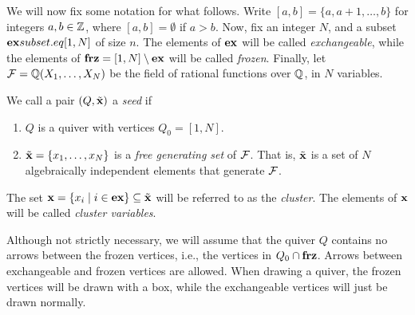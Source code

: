 We will now fix some notation for what follows. Write $[a,b] = \{a, a + 1, \dots, b\}$
for integers $a,b \in \mathbb{Z}$, where $[a,b] = \emptyset$ if $a > b$. Now, fix an integer
$N$, and a subset $\mathbf{ex} subset.eq [1, N]$ of size $n$. The elements of $\mathbf{ex}$ will be
called \emph{exchangeable}, while the elements of $\mathbf{frz} = [1, N]
	\setminus \mathbf{ex}$ will be called \emph{frozen}. Finally, let $\mathcal{F} = \mathbb{Q}
	(X_1, \dots, X_N)$ be the field of rational functions over $\mathbb{Q}$, in $N$ variables.

\begin{definition}
	We call a pair $(Q, \tilde{\mathbf{x}})$ a \emph{seed} if
	\begin{enumerate}
		\item $Q$ is a quiver with vertices $Q_0 = [1, N]$.
		\item $\tilde{\mathbf{x}} = \{x_1, \dots, x_N\}$ is a \emph{free generating set} of $\mathcal{F}$. That is, $\tilde{\mathbf{x}}$ is a set of $N$ algebraically independent elements that generate $\mathcal{F}$.
	\end{enumerate}
	The set $\mathbf{x} = \{x_i \mid i \in \mathbf{ex}\} \subseteq \tilde{\mathbf{x}}$ will be referred to as the \emph{cluster}. The elements of $\mathbf{x}$ will be called \emph{cluster variables}.
\end{definition}

Although not strictly necessary, we will assume that the quiver $Q$ contains no arrows
between the frozen vertices, i.e., the vertices in $Q_0 \cap \mathbf{frz}$. Arrows between
exchangeable and frozen vertices are allowed. When drawing a quiver, the frozen
vertices will be drawn with a box, while the exchangeable vertices will just be drawn
normally.

